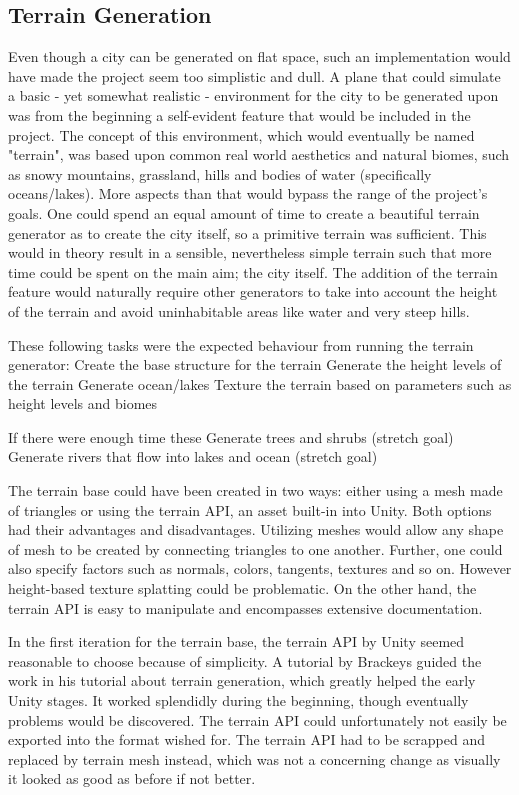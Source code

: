 \subsection{Terrain Generation}

Even though a city can be generated on flat space, such an implementation would have made the project seem too simplistic and dull.
A plane that could simulate a basic - yet somewhat realistic - environment for the city to be generated upon was from the beginning a self-evident feature that would be included in the project. 
The concept of this environment, which would eventually be named "terrain", was based upon common real world aesthetics and natural biomes, such as snowy mountains, grassland, hills and bodies of water (specifically oceans/lakes).
More aspects than that would bypass the range of the project’s goals.
One could spend an equal amount of time to create a beautiful terrain generator as to create the city itself, so a primitive terrain was sufficient.
This would in theory result in a sensible, nevertheless simple terrain such that more time could be spent on the main aim; the city itself.
The addition of the terrain feature would naturally require other generators to take into account the height of the terrain and avoid uninhabitable areas like water and very steep hills. 

These following tasks were the expected behaviour from running the terrain generator:
Create the base structure for the terrain
Generate the height levels of the terrain
Generate ocean/lakes
Texture the terrain based on parameters such as height levels and biomes

If there were enough time these 
Generate trees and shrubs (stretch goal)
Generate rivers that flow into lakes and ocean (stretch goal)

The terrain base could have been created in two ways: either using a mesh made of triangles or using the terrain API, an asset built-in into Unity.
Both options had their advantages and disadvantages.
Utilizing meshes would allow any shape of mesh to be created by connecting triangles to one another.
Further, one could also specify factors such as normals, colors, tangents, textures and so on.
However height-based texture splatting could be problematic.
On the other hand, the terrain API is easy to manipulate and encompasses extensive documentation.

In the first iteration for the terrain base, the terrain API by Unity seemed reasonable to choose because of simplicity. A tutorial by Brackeys guided the work in his tutorial about terrain generation, which greatly helped the early Unity stages.
It worked splendidly during the beginning, though eventually problems would be discovered.
The terrain API could unfortunately not easily be exported into the format wished for.
The terrain API had to be scrapped and replaced by terrain mesh instead, which was not a concerning change as visually it looked as good as before if not better. 

